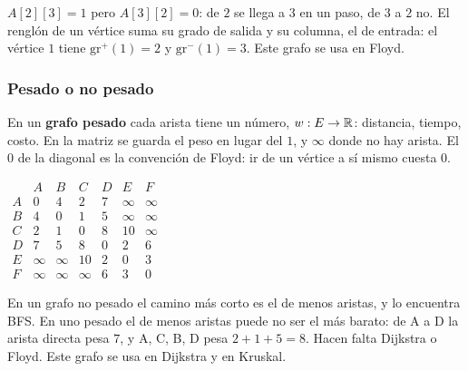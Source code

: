 \documentclass[11pt,letterpaper]{article}
\begin{document}
$A[2][3] = 1$ pero $A[3][2] = 0$: de $2$ se llega a $3$ en un paso,
de $3$ a $2$ no. El renglón de un vértice suma su grado de salida y
su columna, el de entrada: el vértice $1$ tiene $\text{gr}^{+}(1) = 2$
y $\text{gr}^{-}(1) = 3$. Este grafo se usa en Floyd.

\subsubsection*{Pesado o no pesado}

En un \textbf{grafo pesado} cada arista tiene un número,
$w : E \to \mathbb{R}$: distancia, tiempo, costo. En la matriz se guarda el
peso en lugar del $1$, y $\infty$ donde no hay arista. El $0$ de la
diagonal es la convención de Floyd: ir de un vértice a sí mismo
cuesta $0$.

\begin{center}
\hspace{0.8cm}
$\begin{array}{c|cccccc}
    & A & B & C & D & E & F \\ \hline
  A & 0 & 4 & 2 & 7 & \infty & \infty \\
  B & 4 & 0 & 1 & 5 & \infty & \infty \\
  C & 2 & 1 & 0 & 8 & 10 & \infty \\
  D & 7 & 5 & 8 & 0 & 2 & 6 \\
  E & \infty & \infty & 10 & 2 & 0 & 3 \\
  F & \infty & \infty & \infty & 6 & 3 & 0
\end{array}$
\end{center}

En un grafo no pesado el camino más corto es el de menos aristas, y
lo encuentra BFS. En uno pesado el de menos aristas puede no ser el
más barato: de A a D la arista directa pesa $7$, y A, C, B, D pesa
$2 + 1 + 5 = 8$. Hacen falta Dijkstra o Floyd. Este grafo se usa en
Dijkstra y en Kruskal.
\end{document}
